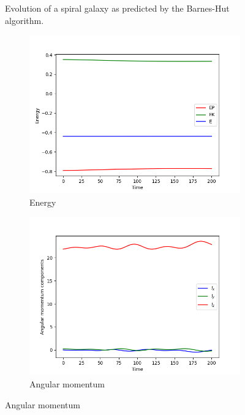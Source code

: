 \begin{figure}[H]
    \caption{Evolution of a spiral galaxy as predicted by the Barnes-Hut algorithm.}
    \label{fig:spiral-galaxy-evolution-bh}
\end{figure}

\begin{figure}[H]
    \centering
    \begin{subfigure}[b]{0.5\textwidth}
        \centering
        \includegraphics[width=\textwidth]{chapters/results/img/bh-galaxy/energy.png}
        \caption{Energy}
        \label{fig:physical-quantities-bh-sub1}
    \end{subfigure}

    \vspace{0.2cm}

    \begin{subfigure}[b]{0.5\textwidth}
        \centering
        \includegraphics[width=\textwidth]{chapters/results/img/bh-galaxy/angular-momentum.png}
        \caption{Angular momentum}
        \label{fig:physical-quantities-bh-sub2}
    \end{subfigure}


\end{figure}
